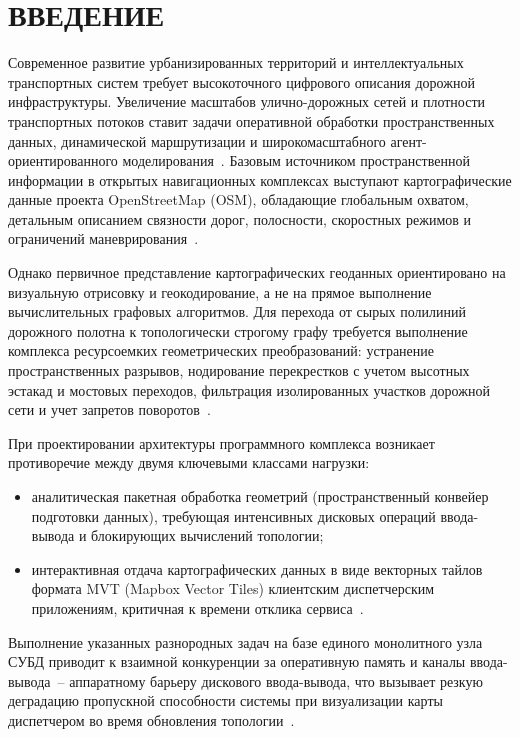 \chapter*{ВВЕДЕНИЕ}

Современное развитие урбанизированных территорий и интеллектуальных транспортных систем требует высокоточного цифрового описания дорожной инфраструктуры. Увеличение масштабов улично-дорожных сетей и плотности транспортных потоков ставит задачи оперативной обработки пространственных данных, динамической маршрутизации и широкомасштабного агент-ориентированного моделирования~\cite{lyashenko2019postgis}. Базовым источником пространственной информации в открытых навигационных комплексах выступают картографические данные проекта OpenStreetMap (OSM), обладающие глобальным охватом, детальным описанием связности дорог, полосности, скоростных режимов и ограничений маневрирования~\cite{mdpi_osm_innovation_2025}.

Однако первичное представление картографических геоданных ориентировано на визуальную отрисовку и геокодирование, а не на прямое выполнение вычислительных графовых алгоритмов. Для перехода от сырых полилиний дорожного полотна к топологически строгому графу требуется выполнение комплекса ресурсоемких геометрических преобразований: устранение пространственных разрывов, нодирование перекрестков с учетом высотных эстакад и мостовых переходов, фильтрация изолированных участков дорожной сети и учет запретов поворотов~\cite{vasin2016spatial, crunchydata2026routing}.

При проектировании архитектуры программного комплекса возникает противоречие между двумя ключевыми классами нагрузки:
\begin{itemize}
    \item аналитическая пакетная обработка геометрий (пространственный конвейер подготовки данных), требующая интенсивных дисковых операций ввода-вывода и блокирующих вычислений топологии;
    \item интерактивная отдача картографических данных в виде векторных тайлов формата MVT (Mapbox Vector Tiles) клиентским диспетчерским приложениям, критичная к времени отклика сервиса~\cite{kuvshinov2025mvt, postgis_asmvt}.
\end{itemize}

Выполнение указанных разнородных задач на базе единого монолитного узла СУБД приводит к взаимной конкуренции за оперативную память и каналы ввода-вывода~-- аппаратному барьеру дискового ввода-вывода, что вызывает резкую деградацию пропускной способности системы при визуализации карты диспетчером во время обновления топологии~\cite{postolenko2025_complexities}.

